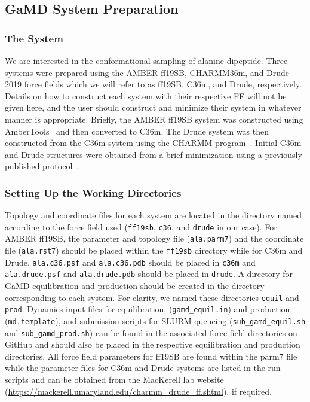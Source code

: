 \documentclass[9pt,tutorial]{livecoms}
\begin{document}
\subsection{GaMD System Preparation} 

\subsubsection{The System}
We are interested in the conformational sampling of alanine dipeptide. Three systems were prepared using the AMBER ff19SB, CHARMM36m, and Drude-2019 force fields which we will refer to as ff19SB, C36m, and Drude, respectively. Details on how to construct each system with their respective FF will not be given here, and the user should construct and minimize their system in whatever manner is appropriate. Briefly, the AMBER ff19SB system was constructed using AmberTools~\cite{case_ambertools_2023} and then converted to C36m. The Drude system was then constructed from the C36m system using the CHARMM program~\cite{hwang_charmm_2024}. Initial C36m and Drude structures were obtained from a brief minimization using a previously published protocol~\cite{lemkul_preparing_2021}.

\subsubsection{Setting Up the Working Directories} 
Topology and coordinate files for each system are located in the directory named according to the force field used (\texttt{ff19sb}, \texttt{c36}, and \texttt{drude} in our case). For AMBER ff19SB, the parameter and topology file (\texttt{ala.parm7}) and the coordinate file (\texttt{ala.rst7}) should be placed within the \texttt{ff19sb} directory while for C36m and Drude, \texttt{ala.c36.psf} and \texttt{ala.c36.pdb} should be placed in \texttt{c36m} and \texttt{ala.drude.psf} and \texttt{ala.drude.pdb} should be placed in \texttt{drude}. A directory for GaMD equilibration and production should be created in the directory corresponding to each system. For clarity, we named these directories \texttt{equil} and \texttt{prod}. Dynamics input files for equilibration, (\texttt{gamd\_equil.in}) and production (\texttt{md.template}), and submission scripts for SLURM queueing (\texttt{sub\_gamd\_equil.sh} and \texttt{sub\_gamd\_prod.sh}) can be found in the associated force field directories on GitHub and should also be placed in the respective equilibration and production directories. All force field parameters for ff19SB are found within the parm7 file while the parameter files for C36m and Drude systems are listed in the run scripts and can be obtained from the MacKerell lab website (\url{https://mackerell.umaryland.edu/charmm_drude_ff.shtml}), if required. 
\end{document}
